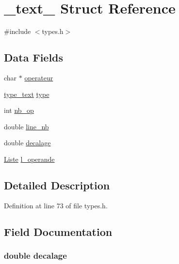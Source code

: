 \hypertarget{struct__text__}{\section{\-\_\-text\-\_\- Struct Reference}
\label{struct__text__}
}


{\ttfamily \#include $<$types.\-h$>$}

\subsection*{Data Fields}
\begin{DoxyCompactItemize}
\item 
char $\ast$ \hyperlink{struct__text___adc2a267b945f31e8e0dad4b528128cab}{operateur}
\item 
\hyperlink{types_8h_a964e2c8dafb8a61ce88c06a5dff4a404}{type\-\_\-text} \hyperlink{struct__text___a92c69ddff0b8be636cead81c5b73f667}{type}
\item 
int \hyperlink{struct__text___a88a29c0db6a919d126d1c94d573dd711}{nb\-\_\-op}
\item 
double \hyperlink{struct__text___a808a37180ef5a21555b2f0f68cf73cb6}{line\-\_\-nb}
\item 
double \hyperlink{struct__text___aac945295366b3dadfd1ec0da01eb6cb8}{decalage}
\item 
\hyperlink{liste_8h_a5268448ae2a031c105e053d5ea682580}{Liste} \hyperlink{struct__text___acdac487d99d10dba873a0f07707b220f}{l\-\_\-operande}
\end{DoxyCompactItemize}


\subsection{Detailed Description}


Definition at line 73 of file types.\-h.



\subsection{Field Documentation}
\hypertarget{struct__text___aac945295366b3dadfd1ec0da01eb6cb8}{
\subsubsection[{decalage}]{\setlength{\rightskip}{0pt plus 5cm}double decalage}}\label{struct__text___aac945295366b3dadfd1ec0da01eb6cb8}


